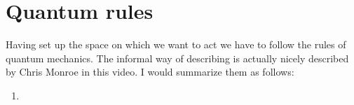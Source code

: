\section{Quantum rules}
Having set up the space on which we want to act we have to follow the rules of quantum mechanics. The informal way of describing is actually nicely described by Chris Monroe in this video. I would summarize them as follows:
\begin{enumerate}
\item 
\end{enumerate}